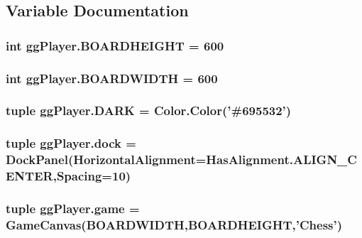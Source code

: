 \subsection{Variable Documentation}
\hypertarget{namespacegg_player_a22ebbb0c34f90b06ea41271eec89d6fe}{
\subsubsection[{B\-O\-A\-R\-D\-H\-E\-I\-G\-H\-T}]{\setlength{\rightskip}{0pt plus 5cm}int gg\-Player.\-B\-O\-A\-R\-D\-H\-E\-I\-G\-H\-T = 600}}\label{namespacegg_player_a22ebbb0c34f90b06ea41271eec89d6fe}
\hypertarget{namespacegg_player_a4054f3b504e92346c8100419c68c97d3}{
\subsubsection[{B\-O\-A\-R\-D\-W\-I\-D\-T\-H}]{\setlength{\rightskip}{0pt plus 5cm}int gg\-Player.\-B\-O\-A\-R\-D\-W\-I\-D\-T\-H = 600}}\label{namespacegg_player_a4054f3b504e92346c8100419c68c97d3}
\hypertarget{namespacegg_player_ad554292d3744ea74e0523b34b537013b}{
\subsubsection[{D\-A\-R\-K}]{\setlength{\rightskip}{0pt plus 5cm}tuple gg\-Player.\-D\-A\-R\-K = Color.\-Color('\#695532')}}\label{namespacegg_player_ad554292d3744ea74e0523b34b537013b}
\hypertarget{namespacegg_player_ad7968018d930130dfd2fb1a4cb6d6433}{
\subsubsection[{dock}]{\setlength{\rightskip}{0pt plus 5cm}tuple gg\-Player.\-dock = Dock\-Panel(Horizontal\-Alignment=Has\-Alignment.\-A\-L\-I\-G\-N\-\_\-\-C\-E\-N\-T\-E\-R,Spacing=10)}}\label{namespacegg_player_ad7968018d930130dfd2fb1a4cb6d6433}
\hypertarget{namespacegg_player_a8fdb2fa9bacc3b4e36bf435bf96fa8a5}{
\subsubsection[{game}]{\setlength{\rightskip}{0pt plus 5cm}tuple gg\-Player.\-game = {\bf Game\-Canvas}({\bf B\-O\-A\-R\-D\-W\-I\-D\-T\-H},{\bf B\-O\-A\-R\-D\-H\-E\-I\-G\-H\-T},'Chess')}}\label{namespacegg_player_a8fdb2fa9bacc3b4e36bf435bf96fa8a5}
